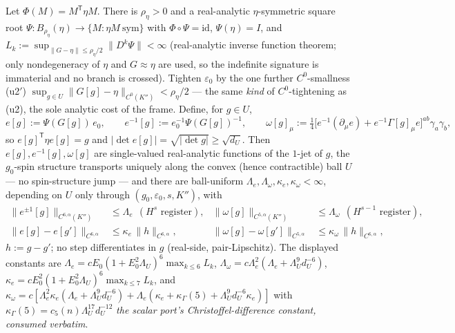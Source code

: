 \begin{lemma}\label{dspin:lem-frame}
Let $\Phi(M)=M^{\mathsf T}\eta M$. There is $\rho_\eta>0$ and a real-analytic
$\eta$-symmetric square root $\Psi:B_{\rho_\eta}(\eta)\to\{M:\eta M\ \mathrm{sym}\}$
with $\Phi\circ\Psi=\mathrm{id}$, $\Psi(\eta)=I$, and $L_k:=\sup_{\|G-\eta\|
\le\rho_\eta/2}\|D^k\Psi\|<\infty$ (real-analytic inverse function theorem;
only nondegeneracy of $\eta$ and $G\approx\eta$ are used, so the indefinite
signature is immaterial and no branch is crossed). Tighten $\varepsilon_0$ by
the one further $C^0$-smallness \textup{(u2$'$)} $\sup_{g\in U}\|G[g]-\eta\|
_{C^0(K'')}<\rho_\eta/2$ --- the same \emph{kind} of $C^0$-tightening as
\textup{(u2)}, the sole analytic cost of the frame. Define, for $g\in U$,
\[
  e[g]:=\Psi(G[g])\,e_0,\qquad e^{-1}[g]:=e_0^{-1}\Psi(G[g])^{-1},\qquad
  \omega[g]_\mu:=\tfrac14\bigl[e^{-1}(\partial_\mu e)+e^{-1}\Gamma[g]_\mu e\bigr]
  ^{ab}\gamma_a\gamma_b,
\]
so $e[g]^{\mathsf T}\eta e[g]=g$ and $|\det e[g]|=\sqrt{|\det g|}\ge
\sqrt{d_U}$. Then $e[g],e^{-1}[g],\omega[g]$ are single-valued real-analytic
functions of the $1$-jet of $g$, the $g_0$-spin structure transports uniquely
along the convex (hence contractible) ball $U$ --- no spin-structure jump ---
and there are ball-uniform $\Lambda_e,\Lambda_\omega,\kappa_e,\kappa_\omega
<\infty$, depending on $U$ only through $(g_0,\varepsilon_0,s,K'')$, with
\begin{align}
  \|e^{\pm1}[g]\|_{C^{6,\alpha}(K'')}&\le\Lambda_e\ \ (H^s\text{ register}),
  &\|\omega[g]\|_{C^{5,\alpha}(K'')}&\le\Lambda_\omega\ \ (H^{s-1}\text{ register}),
  \label{dspin:eq-framesup}\\
  \|e[g]-e[g']\|_{C^{6,\alpha}}&\le\kappa_e\,\|h\|_{C^{6,\alpha}},
  &\|\omega[g]-\omega[g']\|_{C^{5,\alpha}}&\le\kappa_\omega\,\|h\|_{C^{6,\alpha}},
  \label{dspin:eq-framediff}
\end{align}
$h:=g-g'$; no step differentiates in $g$ (real-side, pair-Lipschitz). The
displayed constants are
$\Lambda_e=cE_0(1+E_0^2\Lambda_U)^6\max_{k\le6}L_k$,
$\Lambda_\omega=c\Lambda_e^2(\Lambda_e+\Lambda_U^9 d_U^{-6})$,
$\kappa_e=cE_0^2(1+E_0^2\Lambda_U)^6\max_{k\le7}L_k$, and
$\kappa_\omega=c[\Lambda_e^2\kappa_e(\Lambda_e+\Lambda_U^9d_U^{-6})
+\Lambda_e(\kappa_e+\kappa_\Gamma(5)+\Lambda_U^9d_U^{-6}\kappa_e)]$ with
$\kappa_\Gamma(5)=c_5(n)\Lambda_U^{17}d_U^{-12}$ \emph{the scalar port's
Christoffel-difference constant, consumed verbatim}.
\end{lemma}
